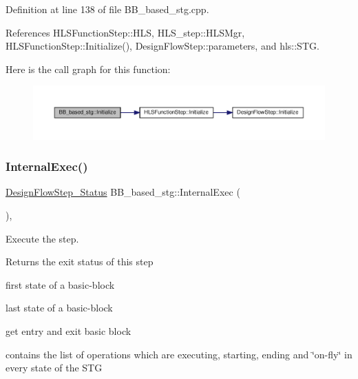 Definition at line 138 of file B\+B\+\_\+based\+\_\+stg.\+cpp.



References H\+L\+S\+Function\+Step\+::\+H\+LS, H\+L\+S\+\_\+step\+::\+H\+L\+S\+Mgr, H\+L\+S\+Function\+Step\+::\+Initialize(), Design\+Flow\+Step\+::parameters, and hls\+::\+S\+TG.

Here is the call graph for this function\+:
\nopagebreak
\begin{figure}[H]
\begin{center}
\leavevmode
\includegraphics[width=350pt]{dd/d84/classBB__based__stg_a68123e6fdc9a397be06ee3058e217ff0_cgraph}
\end{center}
\end{figure}
\mbox{\label{classBB__based__stg_ada4c8f3601fd2e5dee0ccffe8bfdd430}} 
\subsubsection{\texorpdfstring{Internal\+Exec()}{InternalExec()}}
{\footnotesize\ttfamily \hyperlink{design__flow__step_8hpp_afb1f0d73069c26076b8d31dbc8ebecdf}{Design\+Flow\+Step\+\_\+\+Status} B\+B\+\_\+based\+\_\+stg\+::\+Internal\+Exec (\begin{DoxyParamCaption}{ }\end{DoxyParamCaption})\hspace{0.3cm}{\ttfamily [override]}, {\ttfamily [virtual]}}



Execute the step. 

\begin{DoxyReturn}{Returns}
the exit status of this step 
\end{DoxyReturn}
first state of a basic-\/block

last state of a basic-\/block

get entry and exit basic block

contains the list of operations which are executing, starting, ending and \char`\"{}on-\/fly\char`\"{} in every state of the S\+TG

